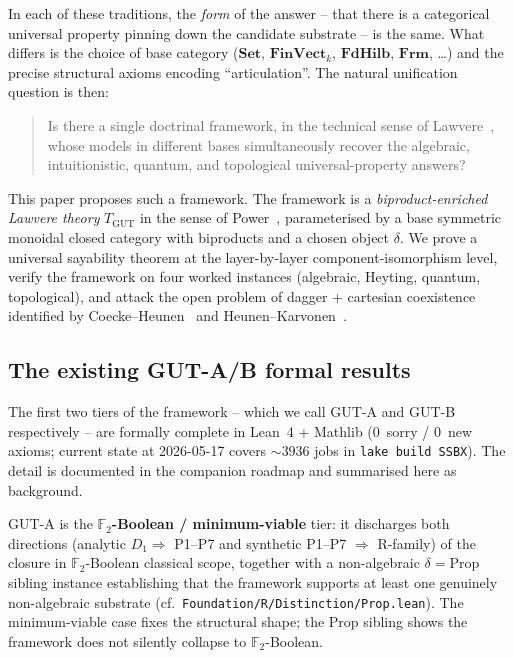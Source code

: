 \documentclass[11pt,a4paper]{article}
\theoremstyle{plain}
\theoremstyle{definition}
\theoremstyle{remark}
\newcommand{\F}{\mathbb{F}}
\newcommand{\cat}[1]{\mathbf{#1}}
\newcommand{\Set}{\cat{Set}}
\newcommand{\FdHilb}{\cat{FdHilb}}
\newcommand{\Frm}{\cat{Frm}}
\newcommand{\FinVect}{\cat{FinVect}}
\newcommand{\TGUT}{T_{\mathrm{GUT}}}
\begin{document}
In each of these traditions, the \emph{form} of the answer -- that there is a categorical universal property pinning down the candidate substrate -- is the same. What differs is the choice of base category ($\Set$, $\FinVect_k$, $\FdHilb$, $\Frm$, \dots) and the precise structural axioms encoding ``articulation''. The natural unification question is then:

\begin{quote}
Is there a single doctrinal framework, in the technical sense of Lawvere~\cite{Law69}, whose models in different bases simultaneously recover the algebraic, intuitionistic, quantum, and topological universal-property answers?
\end{quote}

This paper proposes such a framework. The framework is a \emph{biproduct-enriched Lawvere theory} $\TGUT$ in the sense of Power~\cite{Pow99}, parameterised by a base symmetric monoidal closed category with biproducts and a chosen object $\delta$. We prove a universal sayability theorem at the layer-by-layer component-isomorphism level, verify the framework on four worked instances (algebraic, Heyting, quantum, topological), and attack the open problem of dagger + cartesian coexistence identified by Coecke--Heunen~\cite{CH16} and Heunen--Karvonen~\cite{HK19}.

\subsection{The existing GUT-A/B formal results}\label{sec:intro:gutab}

The first two tiers of the framework -- which we call GUT-A and GUT-B respectively -- are formally complete in Lean~4 + Mathlib (0~sorry / 0~new axioms; current state at 2026-05-17 covers ${\sim}3936$ jobs in \texttt{lake build SSBX}). The detail is documented in the companion roadmap and summarised here as background.

GUT-A is the \textbf{$\F_2$-Boolean / minimum-viable} tier: it discharges both directions (analytic $D_1 \Longrightarrow$ P1--P7 and synthetic P1--P7 $\Longrightarrow$ R-family) of the closure in $\F_2$-Boolean classical scope, together with a non-algebraic $\delta = \mathrm{Prop}$ sibling instance establishing that the framework supports at least one genuinely non-algebraic substrate (cf.\ \texttt{Foundation/R/Distinction/Prop.lean}). The minimum-viable case fixes the structural shape; the Prop sibling shows the framework does not silently collapse to $\F_2$-Boolean.
\end{document}
